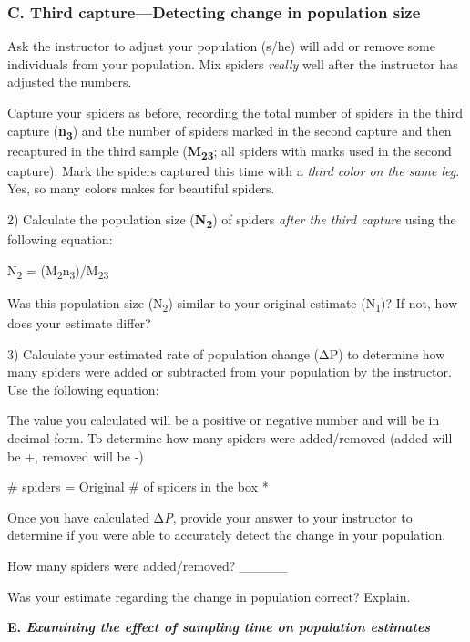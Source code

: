 

\subsubsection{C. Third capture---Detecting change in population
size}\label{c.-third-capturedetecting-change-in-population-size}

Ask the instructor to adjust your population (s/he) will add or remove
some individuals from your population. Mix spiders \emph{really} well
after the instructor has adjusted the numbers.

Capture your spiders as before, recording the total number of spiders in
the third capture (\textbf{n\textsubscript{3}}) and the number of
spiders marked in the second capture and then recaptured in the third
sample (\textbf{M\textsubscript{23}}; all spiders with marks used in the
second capture). Mark the spiders captured this time with a \emph{third
color on the same leg}. Yes, so many colors makes for beautiful spiders.

2) Calculate the population size (\textbf{N\textsubscript{2}}) of
spiders \emph{after the third capture} using the following equation:

N\textsubscript{2} =
(M\textsubscript{2}n\textsubscript{3})/M\textsubscript{23}

Was this population size (N\textsubscript{2}) similar to your original
estimate (N\textsubscript{1})? If not, how does your estimate differ?


3) Calculate your estimated rate of population change (ΔP) to determine
how many spiders were added or subtracted from your population by the
instructor. Use the following equation:

The value you calculated will be a positive or negative number and will
be in decimal form. To determine how many spiders were added/removed
(added will be +, removed will be -)

\# spiders = Original \# of spiders in the box *

Once you have calculated Δ\emph{P}, provide your answer to your
instructor to determine if you were able to accurately detect the change
in your population.

How many spiders were added/removed? \_\_\_\_\_

Was your estimate regarding the change in population correct? Explain.

\textbf{E. \emph{Examining the effect of sampling time on population
estimates}}

